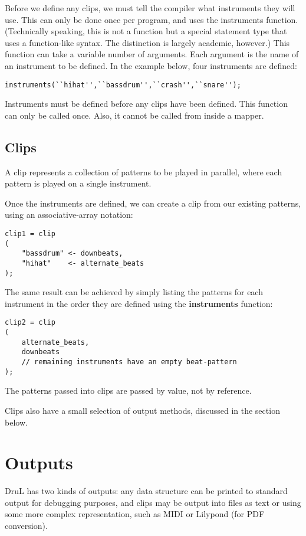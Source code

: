 Before we define any clips, we must tell the compiler what instruments they will use.
This can only be done once per program, and uses the instruments function.
(Technically speaking, this is not a function but a special statement type that uses a function-like syntax.  The distinction is largely academic, however.)
This function can take a variable number of arguments.  Each argument is the name of an instrument to be defined.  In the example below, four instruments are defined:

\begin{verbatim}
instruments(``hihat'',``bassdrum'',``crash'',``snare'');
\end{verbatim}

Instruments must be defined before any clips have been defined. This function
can only be called once. Also, it cannot be called from inside a mapper.

\subsection{Clips}

A clip represents a collection of patterns to be played in parallel, where each pattern is played on a single instrument.

Once the instruments are defined, we can create a clip from our existing patterns, using an
associative-array notation:

\begin{verbatim}
clip1 = clip
(
    "bassdrum" <- downbeats,
    "hihat"    <- alternate_beats
);
\end{verbatim}
The same result can be achieved by simply listing the patterns for each instrument in the order they are defined using the \textbf{instruments} function:
\begin{verbatim}
clip2 = clip
(
    alternate_beats,
    downbeats
    // remaining instruments have an empty beat-pattern
);

\end{verbatim}
The patterns passed into clips are passed by value, not by reference.

Clips also have a small selection of output methods, discussed in the section below.

\section{Outputs}

DruL has two kinds of outputs: any data structure can be printed to standard output for debugging purposes, and clips may be output into files as text or using some
more complex representation, such as MIDI or Lilypond (for PDF conversion).

